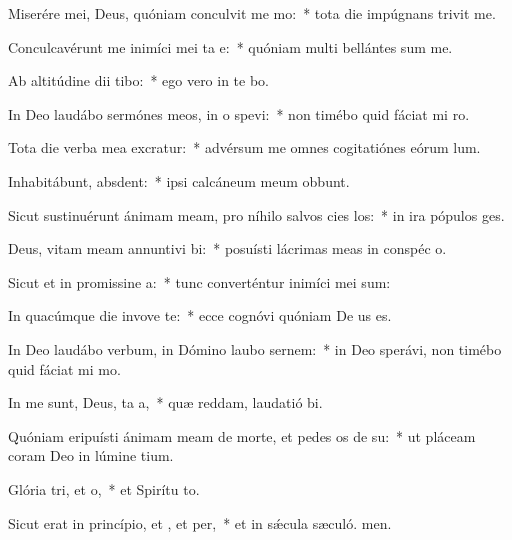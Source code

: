 \item Miserére mei, Deus, quóniam conculvit me mo:~* tota die impúgnans trivit me.
\item Conculcavérunt me inimíci mei ta e:~* quóniam multi bellántes sum me.
\item Ab altitúdine dii tibo:~* ego vero in te bo.
\item In Deo laudábo sermónes meos, in o spevi:~* non timébo quid fáciat mi ro.
\item Tota die verba mea excratur:~* advérsum me omnes cogitatiónes eórum  lum.
\item Inhabitábunt,  absdent:~* ipsi calcáneum meum obbunt.
\item Sicut sustinuérunt ánimam meam, pro níhilo salvos cies los:~* in ira pópulos ges.
\item Deus, vitam meam annuntivi bi:~* posuísti lácrimas meas in conspéc o.
\item Sicut et in promissine a:~* tunc converténtur inimíci mei sum:
\item In quacúmque die invove te:~* ecce cognóvi quóniam De us es.
\item In Deo laudábo verbum, in Dómino laubo sernem:~* in Deo sperávi, non timébo quid fáciat mi mo.
\item In me sunt, Deus, ta a,~* quæ reddam, laudatió bi.
\item Quóniam eripuísti ánimam meam de morte, et pedes os de su:~* ut pláceam coram Deo in lúmine tium.
\item Glória tri, et o,~* et Spirítu to.
\item Sicut erat in princípio, et , et per,~* et in sǽcula sæculó. men.
